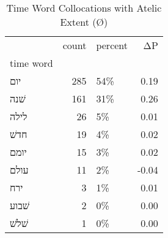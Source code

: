 \begin{table}[htbp!]
\centering
\caption{Time Word Collocations with Atelic Extent (Ø)}
\label{table:atelØ_head_cpd}
\begin{tabular}{lrlr}
\toprule
{} &  count & percent &    ΔP \\
time word &        &         &       \\
\midrule
יום       &    285 &     54\% &  0.19 \\
שׁנה      &    161 &     31\% &  0.26 \\
לילה      &     26 &      5\% &  0.01 \\
חדשׁ      &     19 &      4\% &  0.02 \\
יומם      &     15 &      3\% &  0.02 \\
עולם      &     11 &      2\% & -0.04 \\
ירח       &      3 &      1\% &  0.01 \\
שׁבוע     &      2 &      0\% &  0.00 \\
שׁלשׁ     &      1 &      0\% &  0.00 \\
\bottomrule
\end{tabular}
\end{table}
